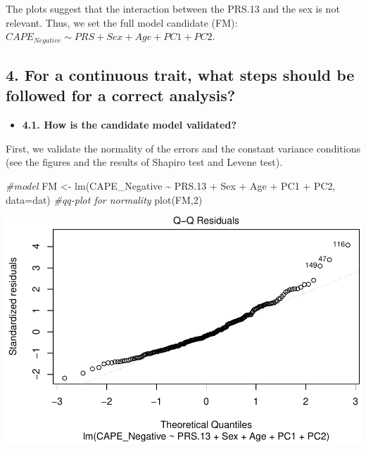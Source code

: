 \documentclass[
]{article}
\newenvironment{Shaded}{\begin{snugshade}}{\end{snugshade}}
\newcommand{\AttributeTok}[1]{\textcolor[rgb]{0.77,0.63,0.00}{#1}}
\newcommand{\CommentTok}[1]{\textcolor[rgb]{0.56,0.35,0.01}{\textit{#1}}}
\newcommand{\DecValTok}[1]{\textcolor[rgb]{0.00,0.00,0.81}{#1}}
\newcommand{\FloatTok}[1]{\textcolor[rgb]{0.00,0.00,0.81}{#1}}
\newcommand{\FunctionTok}[1]{\textcolor[rgb]{0.00,0.00,0.00}{#1}}
\newcommand{\NormalTok}[1]{#1}
\newcommand{\OtherTok}[1]{\textcolor[rgb]{0.56,0.35,0.01}{#1}}
\newcommand{\SpecialCharTok}[1]{\textcolor[rgb]{0.00,0.00,0.00}{#1}}
\providecommand{\tightlist}{%
  \setlength{\itemsep}{0pt}\setlength{\parskip}{0pt}}
\begin{document}
The plots suggest that the interaction between the PRS.13 and the sex is
not relevant. Thus, we set the full model candidate (FM):
\(CAPE_{Negative} \sim PRS + Sex + Age + PC1 +PC2\).

\hypertarget{for-a-continuous-trait-what-steps-should-be-followed-for-a-correct-analysis}{%
\subsection{4. For a continuous trait, what steps should be followed for
a correct
analysis?}\label{for-a-continuous-trait-what-steps-should-be-followed-for-a-correct-analysis}}

\begin{itemize}
\tightlist
\item
  \textbf{4.1. How is the candidate model validated?}
\end{itemize}

First, we validate the normality of the errors and the constant variance
conditions (see the figures and the results of Shapiro test and Levene
test).

\begin{Shaded}
\begin{Highlighting}[]
\CommentTok{\#model}
\NormalTok{FM }\OtherTok{\textless{}{-}} \FunctionTok{lm}\NormalTok{(CAPE\_Negative }\SpecialCharTok{\textasciitilde{}}\NormalTok{ PRS}\FloatTok{.13} \SpecialCharTok{+}\NormalTok{ Sex }\SpecialCharTok{+}\NormalTok{ Age }\SpecialCharTok{+}\NormalTok{ PC1 }\SpecialCharTok{+}\NormalTok{ PC2, }\AttributeTok{data=}\NormalTok{dat)}
\CommentTok{\#qq{-}plot for normality }
\FunctionTok{plot}\NormalTok{(FM,}\DecValTok{2}\NormalTok{)   }
\end{Highlighting}
\end{Shaded}

\includegraphics{Real_data_CAPE_Negative_code_files/figure-latex/unnamed-chunk-7-1.pdf}
\end{document}
